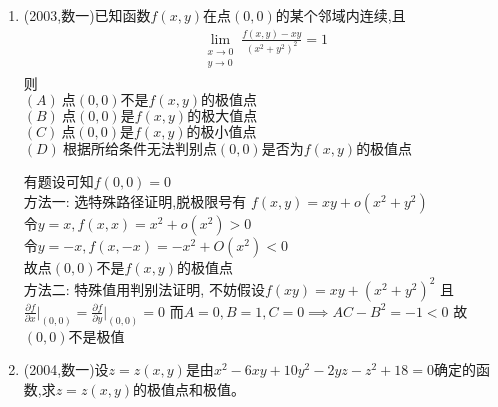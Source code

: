 \documentclass[12pt, a4paper, oneside, UTF8]{ctexbook}
\begin{document}
\begin{enumerate}[label=\arabic*.,start=9]
    \item (2003,数一)已知函数$f(x,y)$在点$(0,0)$的某个邻域内连续,且
    \begin{align*}
        \lim_{\substack{x\to 0\\ y\to 0}}\frac{f(x,y)-xy}{(x^2+y^2)^2}=1
    \end{align*}
    则 \\
    $(A)\ \text{点}(0,0)\text{不是}f(x,y)\text{的极值点}$ \\
    $(B)\ \text{点}(0,0)\text{是}f(x,y)\text{的极大值点}$ \\
    $(C)\ \text{点}(0,0)\text{是}f(x,y)\text{的极小值点}$ \\
    $(D)\ \text{根据所给条件无法判别点}(0,0)\text{是否为}f(x,y)\text{的极值点}$
    
    \begin{solution}
    有题设可知$f(0,0)=0$ \\
    方法一: 选特殊路径证明,脱极限号有 $\displaystyle f(x,y)=xy+o(x^2+y^2)$ \\
    令$y=x,f(x,x)=x^2+o(x^2) > 0$ \\
    令$y=-x,f(x,-x)=-x^2+O(x^2) < 0$ \\
    故点$(0,0)$不是$f(x,y)$的极值点 \\
    方法二: 特殊值用判别法证明, 不妨假设$f(xy)=xy+(x^2+y^2)^2$ 且$\displaystyle \frac{\partial f}{\partial x}\big|_{(0,0)}
    =\frac{\partial f}{\partial y}\big|_{(0,0)}=0$
    而$A=0,B=1,C=0 \implies AC-B^2=-1<0$ 故$(0,0)$不是极值 
    \end{solution}
    
    \item (2004,数一)设$z=z(x,y)$是由$x^2-6xy+10y^2-2yz-z^2+18=0$确定的函数,求$z=z(x,y)$的极值点和极值。
    

\end{enumerate}
\end{document}
